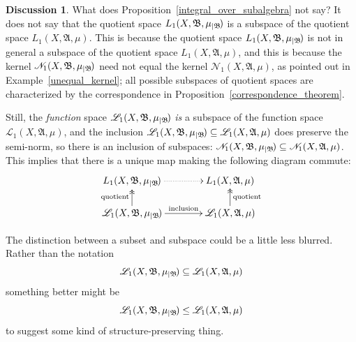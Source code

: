 \documentclass[
twoside=true,
paper=letter,
fontsize=9pt,
pagesize=auto,
leqno,
openany,
headsepline,
overfullrule,
]{scrbook}
\theoremstyle{plain}
\theoremstyle{plain}
\theoremstyle{definition}
\newtheorem{discussion}[thm]{Discussion}
\theoremstyle{bfnoteitalic}
\theoremstyle{bfnoteroman}
\newcommand{\sigalg}[1]{\mathfrak{#1}}
\newcommand{\cali}[1]{\mathscr{#1}}
\newcommand{\restrictedto}[1]{_{\lvert#1}\kern-1.5pt}
\newcommand{\sigmaalgebra}{\sigalg{A}}
\newcommand{\sigmaalgebraii}{\sigalg{B}}
\newcommand{\measurespace}{X}
\newcommand{\measure}{\mu}
\begin{document}
\begin{discussion}\label{L1_subspace_embedding}
What does Proposition~\ref{integral_over_subalgebra} not say?
It does not say that the quotient space $L_1(\measurespace, \sigmaalgebraii, \measure\restrictedto{\sigmaalgebraii})$
is a subspace of the quotient space 
$L_1(\measurespace, \sigmaalgebra, \measure)$.  This is because the quotient space $L_1(\measurespace, \sigmaalgebraii, \measure\restrictedto{\sigmaalgebraii})$
is not in general a subspace of the quotient space 
$L_1(\measurespace, \sigmaalgebra, \measure)$, 
and this is because the kernel
$\cali{N}_1(\measurespace, \sigmaalgebraii, \measure\restrictedto{\sigmaalgebraii})$
need not equal the kernel
$\cali{N}_1(\measurespace, \sigmaalgebra, \measure)$,
as pointed out in 
Example~\ref{unequal_kernel};
all possible subspaces of quotient spaces are characterized by the correspondence 
in Proposition~\ref{correspondence_theorem}.

Still, the \emph{function} space
$\cali{L}_1(\measurespace, \sigmaalgebraii, \measure\restrictedto{\sigmaalgebraii})$
\emph{is} a subspace of the function space
$\cali{L}_1(\measurespace, \sigmaalgebra, \measure)$,
and the inclusion 
$\cali{L}_1(\measurespace, \sigmaalgebraii, \measure\restrictedto{\sigmaalgebraii})
\subseteq
\cali{L}_1(\measurespace, \sigmaalgebra, \measure)$
does preserve the semi-norm, so there is an inclusion of subspaces: 
$\cali{N}_1(\measurespace, \sigmaalgebraii, \measure\restrictedto{\sigmaalgebraii})
\subseteq
\cali{N}_1(\measurespace, \sigmaalgebra, \measure)$. This implies that
there is a unique map making the following diagram commute:
\[
\xymatrix@R=16pt@C=38pt{ 
L_1(\measurespace, \sigmaalgebraii, \measure\restrictedto{\sigmaalgebraii})
\ar@{.>}[r]
&
L_1(\measurespace, \sigmaalgebra, \measure)
\\
\cali{L}_1(\measurespace, \sigmaalgebraii, \measure\restrictedto{\sigmaalgebraii}) \ar[r]^-{\text{inclusion}} 
\ar@{->>}[u]^{\text{quotient}}
&
\cali{L}_1(\measurespace, \sigmaalgebra, \measure)
\ar@{->>}[u]_{\text{quotient}}
}
\]
\end{discussion}






\label{subset_vs_subspace}
\begin{quoting}
\small
The distinction between a subset and subspace could be a little less blurred.  Rather than the notation 
\[
\cali{L}_1(\measurespace, \sigmaalgebraii, \measure\restrictedto{\sigmaalgebraii})
\subseteq
\cali{L}_1(\measurespace, \sigmaalgebra, \measure)
\]
something better might be
\[
\cali{L}_1(\measurespace, \sigmaalgebraii, \measure\restrictedto{\sigmaalgebraii})
\leq
\cali{L}_1(\measurespace, \sigmaalgebra, \measure)
\]
to suggest some kind of structure-preserving thing.
\end{quoting}
\end{document}
